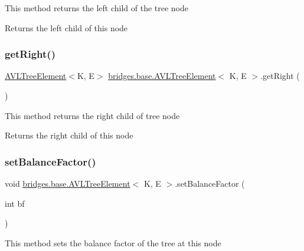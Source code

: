 This method returns the left child of the tree node

\begin{DoxyReturn}{Returns}
the left child of this node 
\end{DoxyReturn}
\mbox{\label{classbridges_1_1base_1_1_a_v_l_tree_element_aab93418ac19605f2c7c57aa38d110921}} 
\subsubsection{\texorpdfstring{getRight()}{getRight()}}
{\footnotesize\ttfamily \mbox{\hyperlink{classbridges_1_1base_1_1_a_v_l_tree_element}{A\+V\+L\+Tree\+Element}}$<$K, E$>$ \mbox{\hyperlink{classbridges_1_1base_1_1_a_v_l_tree_element}{bridges.\+base.\+A\+V\+L\+Tree\+Element}}$<$ K, E $>$.get\+Right (\begin{DoxyParamCaption}{ }\end{DoxyParamCaption})}

This method returns the right child of tree node

\begin{DoxyReturn}{Returns}
the right child of this node 
\end{DoxyReturn}
\mbox{\label{classbridges_1_1base_1_1_a_v_l_tree_element_a0dc3c83e750cc39535afb08ea92f6c98}} 
\subsubsection{\texorpdfstring{setBalanceFactor()}{setBalanceFactor()}}
{\footnotesize\ttfamily void \mbox{\hyperlink{classbridges_1_1base_1_1_a_v_l_tree_element}{bridges.\+base.\+A\+V\+L\+Tree\+Element}}$<$ K, E $>$.set\+Balance\+Factor (\begin{DoxyParamCaption}\item[{int}]{bf }\end{DoxyParamCaption})}

This method sets the balance factor of the tree at this node


